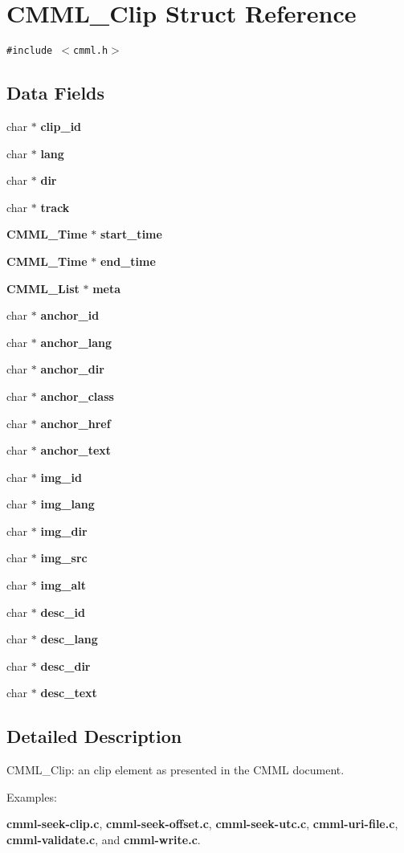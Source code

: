 \section{CMML\_\-Clip Struct Reference}
\label{structCMML__Clip}
{\tt \#include $<$cmml.h$>$}

\subsection*{Data Fields}
\begin{CompactItemize}
\item 
char $\ast$ {\bf clip\_\-id}
\item 
char $\ast$ {\bf lang}
\item 
char $\ast$ {\bf dir}
\item 
char $\ast$ {\bf track}
\item 
{\bf CMML\_\-Time} $\ast$ {\bf start\_\-time}
\item 
{\bf CMML\_\-Time} $\ast$ {\bf end\_\-time}
\item 
{\bf CMML\_\-List} $\ast$ {\bf meta}
\item 
char $\ast$ {\bf anchor\_\-id}
\item 
char $\ast$ {\bf anchor\_\-lang}
\item 
char $\ast$ {\bf anchor\_\-dir}
\item 
char $\ast$ {\bf anchor\_\-class}
\item 
char $\ast$ {\bf anchor\_\-href}
\item 
char $\ast$ {\bf anchor\_\-text}
\item 
char $\ast$ {\bf img\_\-id}
\item 
char $\ast$ {\bf img\_\-lang}
\item 
char $\ast$ {\bf img\_\-dir}
\item 
char $\ast$ {\bf img\_\-src}
\item 
char $\ast$ {\bf img\_\-alt}
\item 
char $\ast$ {\bf desc\_\-id}
\item 
char $\ast$ {\bf desc\_\-lang}
\item 
char $\ast$ {\bf desc\_\-dir}
\item 
char $\ast$ {\bf desc\_\-text}
\end{CompactItemize}


\subsection{Detailed Description}
CMML\_\-Clip: an clip element as presented in the CMML document. \begin{Desc}
\item[Examples: ]\par


{\bf cmml-seek-clip.c}, {\bf cmml-seek-offset.c}, {\bf cmml-seek-utc.c}, {\bf cmml-uri-file.c}, {\bf cmml-validate.c}, and {\bf cmml-write.c}.\end{Desc}




